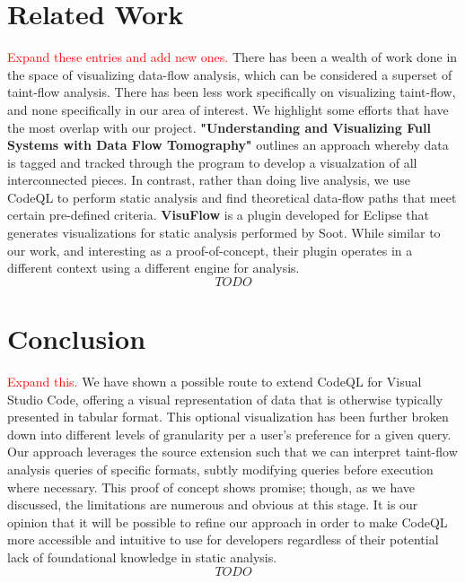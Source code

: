 \documentclass[sigplan,10pt,review]{acmart}
\begin{document}
\section{Related Work}
\textcolor{red}{Expand these entries and add new ones. \newline}
There has been a wealth of work done in the space of visualizing data-flow analysis, which can be considered a superset of taint-flow analysis. There has been less work specifically on visualizing taint-flow, and none specifically in our area of interest. We highlight some efforts that have the most overlap with our project.
\newline\newline
\indent \textbf{"Understanding and Visualizing Full Systems with Data Flow Tomography"} \cite{10.1145/1353535.1346308} outlines an approach whereby data is tagged and tracked through the program to develop a visualzation of all interconnected pieces. In contrast, rather than doing live analysis, we use CodeQL to perform static analysis and find theoretical data-flow paths that meet certain pre-defined criteria.
\newline\newline
\indent \textbf {VisuFlow} \cite{10.1145/3183440.3183470} is a plugin developed for Eclipse that generates visualizations for static analysis performed by Soot. While similar to our work, and interesting as a proof-of-concept, their plugin operates in a different context using a different engine for analysis.
\[TODO\]

\section{Conclusion}
\textcolor{red}{Expand this.\newline}
We have shown a possible route to extend CodeQL for Visual Studio Code, offering a visual representation of data that is otherwise typically presented in tabular format. This optional visualization has been further broken down into different levels of granularity per a user's preference for a given query. Our approach leverages the source extension such that we can interpret taint-flow analysis queries of specific formats, subtly modifying queries before execution where necessary.
\newline
\indent
This proof of concept shows promise; though, as we have discussed, the limitations are numerous and obvious at this stage. It is our opinion that it will be possible to refine our approach in order to make CodeQL more accessible and intuitive to use for developers regardless of their potential lack of foundational knowledge in static analysis.
\[TODO\]


\end{document}
